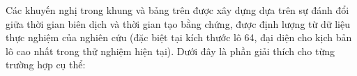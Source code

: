 
Các khuyến nghị trong khung và bảng trên được xây dựng dựa trên sự đánh đổi giữa thời gian biên dịch và thời gian tạo bằng chứng, được định lượng từ dữ liệu thực nghiệm của nghiên cứu (đặc biệt tại kích thước lô 64, đại diện cho kịch bản lô cao nhất trong thử nghiệm hiện tại). Dưới đây là phần giải thích cho từng trường hợp cụ thể:

